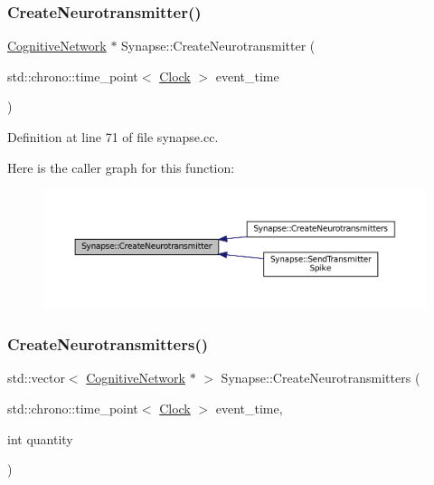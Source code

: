 \subsubsection{\texorpdfstring{Create\+Neurotransmitter()}{CreateNeurotransmitter()}}
{\footnotesize\ttfamily \mbox{\hyperlink{class_cognitive_network}{Cognitive\+Network}} $\ast$ Synapse\+::\+Create\+Neurotransmitter (\begin{DoxyParamCaption}\item[{std\+::chrono\+::time\+\_\+point$<$ \mbox{\hyperlink{universe_8h_a0ef8d951d1ca5ab3cfaf7ab4c7a6fd80}{Clock}} $>$}]{event\+\_\+time }\end{DoxyParamCaption})}



Definition at line 71 of file synapse.\+cc.

Here is the caller graph for this function\+:\nopagebreak
\begin{figure}[H]
\begin{center}
\leavevmode
\includegraphics[width=350pt]{class_synapse_aef4c17534bc93b31de8e81c1ad138b7b_icgraph}
\end{center}
\end{figure}
\mbox{\label{class_synapse_a593c70925fb80b880c6a01f2f252eb22}} 
\subsubsection{\texorpdfstring{Create\+Neurotransmitters()}{CreateNeurotransmitters()}}
{\footnotesize\ttfamily std\+::vector$<$ \mbox{\hyperlink{class_cognitive_network}{Cognitive\+Network}} $\ast$ $>$ Synapse\+::\+Create\+Neurotransmitters (\begin{DoxyParamCaption}\item[{std\+::chrono\+::time\+\_\+point$<$ \mbox{\hyperlink{universe_8h_a0ef8d951d1ca5ab3cfaf7ab4c7a6fd80}{Clock}} $>$}]{event\+\_\+time,  }\item[{int}]{quantity }\end{DoxyParamCaption})}



